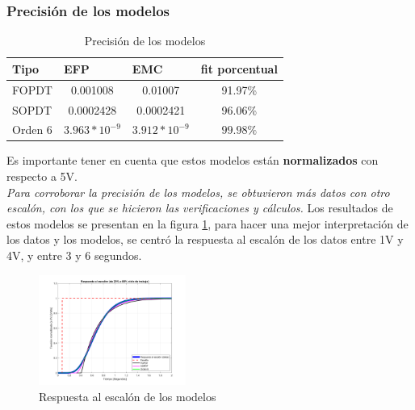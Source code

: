 \documentclass[letterpaper, 10 pt, conference]{ieeeconf}  %
\begin{document}
\vspace{1em}

\subsubsection{Precisión de los modelos}


\begin{table}[htpb]
\centering
\begin{tabular}{|l|c|c|c|}
\hline
\textbf{Tipo} & \multicolumn{1}{l|}{\textbf{EFP}}     & \multicolumn{1}{l|}{\textbf{EMC}}     & \multicolumn{1}{l|}{\textbf{fit porcentual}} \\ \hline
FOPDT   & 0.001008                     & 0.01007                      & 91.97\%                             \\ \hline
SOPDT   & 0.0002428                    & 0.0002421                    & 96.06\%                             \\ \hline
Orden 6 & $3.963*10^{-9}$ & $3.912*10^{-9}$ & $99.98\%$                             \\ \hline
\end{tabular}
  \caption{Precisión de los modelos}
  \label{tab:precision_modelos}
\end{table}

Es importante tener en cuenta que estos modelos están \textbf{normalizados} con respecto a 5V. \\

\textit{Para corroborar la precisión de los modelos, se obtuvieron más datos con otro escalón, con los que se hicieron las verificaciones y cálculos.}
Los resultados de estos modelos se presentan en la figura \ref{fig:resp_esc_modelos}, para hacer una mejor interpretación de los datos y los modelos, se centró la respuesta al escalón de los datos entre 1V y 4V, y entre 3 y 6 segundos.

\begin{figure}[htpb]
  \centering
  \includegraphics[width=0.43\textwidth]{./IMAGENES/resp_esc.png}
  \caption{Respuesta al escalón de los modelos}
  \label{fig:resp_esc_modelos}
\end{figure}
\end{document}
